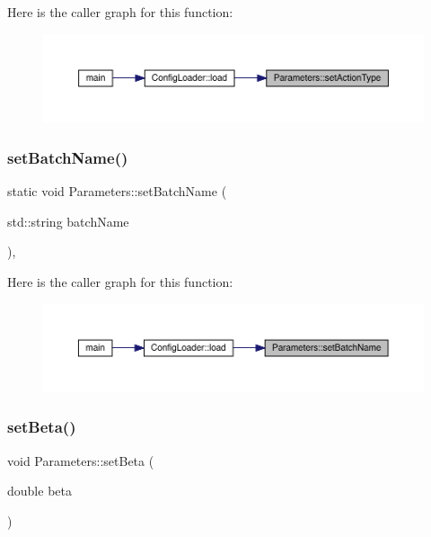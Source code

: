 Here is the caller graph for this function\+:
\nopagebreak
\begin{figure}[H]
\begin{center}
\leavevmode
\includegraphics[width=350pt]{class_parameters_aa7436b658d07358009b922584798fb6d_icgraph}
\end{center}
\end{figure}
\mbox{\label{class_parameters_a8e349761195db7184f309e0f074da84d}} 
\subsubsection{\texorpdfstring{setBatchName()}{setBatchName()}}
{\footnotesize\ttfamily static void Parameters\+::set\+Batch\+Name (\begin{DoxyParamCaption}\item[{std\+::string}]{batch\+Name }\end{DoxyParamCaption})\hspace{0.3cm}{\ttfamily [inline]}, {\ttfamily [static]}}

Here is the caller graph for this function\+:
\nopagebreak
\begin{figure}[H]
\begin{center}
\leavevmode
\includegraphics[width=350pt]{class_parameters_a8e349761195db7184f309e0f074da84d_icgraph}
\end{center}
\end{figure}
\mbox{\label{class_parameters_a8462149cb29ecf936f1f9945f5de4908}} 
\subsubsection{\texorpdfstring{setBeta()}{setBeta()}}
{\footnotesize\ttfamily void Parameters\+::set\+Beta (\begin{DoxyParamCaption}\item[{double}]{beta }\end{DoxyParamCaption})\hspace{0.3cm}{\ttfamily [static]}}

